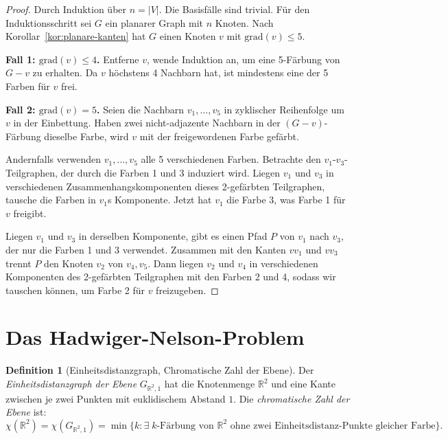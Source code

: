 \documentclass[12pt,a4paper]{amsart}
\theoremstyle{definition}
\newtheorem{definition}[theorem]{Definition}
\theoremstyle{remark}
\newcommand{\R}{\mathbb{R}}
\newcommand{\chr}{\chi}
\newcommand{\grad}{\mathrm{grad}}
\begin{document}
\begin{proof}
Durch Induktion über $n = |V|$. Die Basisfälle sind trivial. Für den
Induktionsschritt sei $G$ ein planarer Graph mit $n$ Knoten. Nach
Korollar~\ref{kor:planare-kanten} hat $G$ einen Knoten $v$ mit $\grad(v) \le 5$.

\textbf{Fall 1: $\grad(v) \le 4$.} Entferne $v$, wende Induktion an, um eine
5-Färbung von $G - v$ zu erhalten. Da $v$ höchstens 4 Nachbarn hat, ist
mindestens eine der 5 Farben für $v$ frei.

\textbf{Fall 2: $\grad(v) = 5$.} Seien die Nachbarn $v_1, \ldots, v_5$ in
zyklischer Reihenfolge um $v$ in der Einbettung. Haben zwei nicht-adjazente
Nachbarn in der $(G-v)$-Färbung dieselbe Farbe, wird $v$ mit der freigewordenen
Farbe gefärbt.

Andernfalls verwenden $v_1, \ldots, v_5$ alle 5 verschiedenen Farben. Betrachte
den $v_1$-$v_3$-Teilgraphen, der durch die Farben 1 und 3 induziert wird.
Liegen $v_1$ und $v_3$ in verschiedenen Zusammenhangskomponenten dieses
2-gefärbten Teilgraphen, tausche die Farben in $v_1$s Komponente. Jetzt hat
$v_1$ die Farbe 3, was Farbe 1 für $v$ freigibt.

Liegen $v_1$ und $v_3$ in derselben Komponente, gibt es einen Pfad $P$ von
$v_1$ nach $v_3$, der nur die Farben 1 und 3 verwendet. Zusammen mit den
Kanten $vv_1$ und $vv_3$ trennt $P$ den Knoten $v_2$ von $v_4, v_5$. Dann
liegen $v_2$ und $v_4$ in verschiedenen Komponenten des 2-gefärbten Teilgraphen
mit den Farben 2 und 4, sodass wir tauschen können, um Farbe 2 für $v$
freizugeben.
\end{proof}

\section{Das Hadwiger-Nelson-Problem}
\label{sec:hadwiger}

\begin{definition}[Einheitsdistanzgraph, Chromatische Zahl der Ebene]
Der \emph{Einheitsdistanzgraph der Ebene} $G_{\R^2, 1}$ hat die Knotenmenge
$\R^2$ und eine Kante zwischen je zwei Punkten mit euklidischem Abstand $1$.
Die \emph{chromatische Zahl der Ebene} ist:
\[
  \chr(\R^2) = \chr(G_{\R^2, 1})
  = \min\bigl\{k : \exists\; k\text{-Färbung von } \R^2 \text{ ohne zwei
    Einheitsdistanz-Punkte gleicher Farbe}\bigr\}.
\]
\end{definition}
\end{document}
